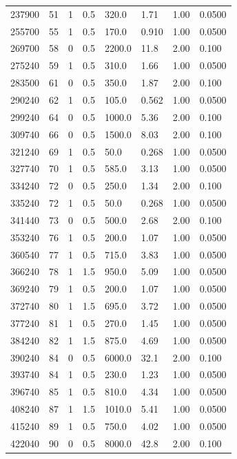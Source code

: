 \documentclass[preview]{standalone}
\begin{document}
{{\begin{tabular}{L{1.2cm}C{1.2cm} C{0.3cm}C{0.5cm} C{1.4cm}C{1.4cm} C{1.4cm}C{1.4cm}}
  237900  &    51  & 1     & 0.5 &  320.0  & 1.71  & 1.00 &  0.0500   \\ 
  255700  &    55  & 1     & 0.5 &  170.0  & 0.910  & 1.00 &  0.0500   \\ 
  269700  &    58  & 0     & 0.5 &  2200.0  & 11.8  & 2.00 &  0.100   \\ 
  275240  &    59  & 1     & 0.5 &  310.0  & 1.66  & 1.00 &  0.0500   \\ 
  283500  &    61  & 0     & 0.5 &  350.0  & 1.87  & 2.00 &  0.100   \\ 
  290240  &    62  & 1     & 0.5 &  105.0  & 0.562  & 1.00 &  0.0500   \\ 
  299240  &    64  & 0     & 0.5 &  1000.0  & 5.36  & 2.00 &  0.100   \\ 
  309740  &    66  & 0     & 0.5 &  1500.0  & 8.03  & 2.00 &  0.100   \\ 
  321240  &    69  & 1     & 0.5 &  50.0  & 0.268  & 1.00 &  0.0500   \\ 
  327740  &    70  & 1     & 0.5 &  585.0  & 3.13  & 1.00 &  0.0500   \\ 
  334240  &    72  & 0     & 0.5 &  250.0  & 1.34  & 2.00 &  0.100   \\ 
  335240  &    72  & 1     & 0.5 &  50.0  & 0.268  & 1.00 &  0.0500   \\ 
  341440  &    73  & 0     & 0.5 &  500.0  & 2.68  & 2.00 &  0.100   \\ 
  353240  &    76  & 1     & 0.5 &  200.0  & 1.07  & 1.00 &  0.0500   \\ 
  360540  &    77  & 1     & 0.5 &  715.0  & 3.83  & 1.00 &  0.0500   \\ 
  366240  &    78  & 1     & 1.5 &  950.0  & 5.09  & 1.00 &  0.0500   \\ 
  369240  &    79  & 1     & 0.5 &  200.0  & 1.07  & 1.00 &  0.0500   \\ 
  372740  &    80  & 1     & 1.5 &  695.0  & 3.72  & 1.00 &  0.0500   \\ 
  377240  &    81  & 1     & 0.5 &  270.0  & 1.45  & 1.00 &  0.0500   \\ 
  384240  &    82  & 1     & 1.5 &  875.0  & 4.69  & 1.00 &  0.0500   \\ 
  390240  &    84  & 0     & 0.5 &  6000.0  & 32.1  & 2.00 &  0.100   \\ 
  393740  &    84  & 1     & 0.5 &  230.0  & 1.23  & 1.00 &  0.0500   \\ 
  396740  &    85  & 1     & 0.5 &  810.0  & 4.34  & 1.00 &  0.0500   \\ 
  408240  &    87  & 1     & 1.5 &  1010.0  & 5.41  & 1.00 &  0.0500   \\ 
  415240  &    89  & 1     & 0.5 &  750.0  & 4.02  & 1.00 &  0.0500   \\ 
  422040  &    90  & 0     & 0.5 &  8000.0  & 42.8  & 2.00 &  0.100   \\ 
\hline 
\end{tabular} 

}}
\end{document}
